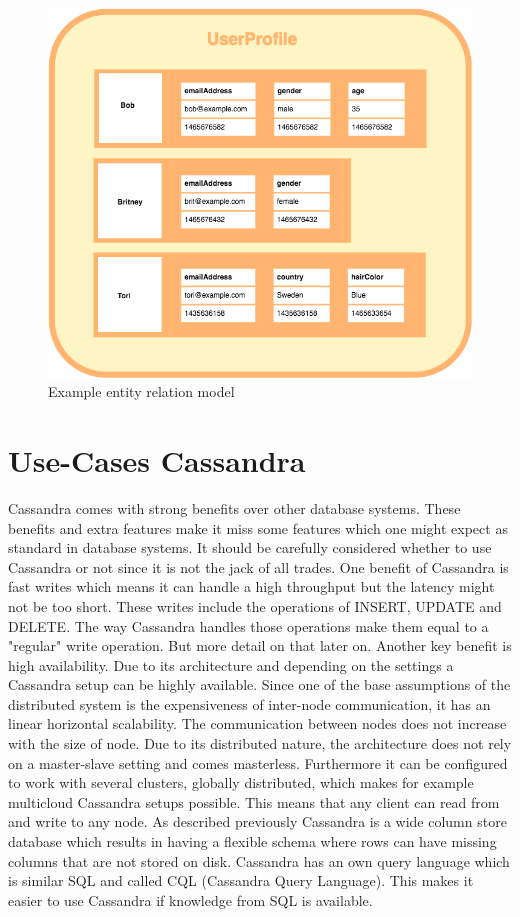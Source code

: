 \begin{figure}[H]
    \centering
    \includegraphics[width=0.75\columnwidth]{img/wide_column_store.png}
    \caption{Example entity relation model \autocite{wideColumnGraphic}}
    \label{fig:cassandra:wide_column}
\end{figure}


\section{Use-Cases Cassandra}
Cassandra comes with strong benefits over other database systems. These benefits and extra features make it miss some features which one might expect as standard in database systems.
It should be carefully considered whether to use Cassandra or not since it is not the jack of all trades.
One benefit of Cassandra is fast writes which means it can handle a high throughput but the latency might not be too short. These writes include the operations of {INSERT}, {UPDATE} and {DELETE}.
The way Cassandra handles those operations make them equal to a "regular" write operation. But more detail on that later on. Another key benefit is high availability. Due to its architecture and depending on the settings a Cassandra setup can be highly available. Since one of the base assumptions of the distributed system is the expensiveness of inter-node communication, it has an linear horizontal scalability.
The communication between nodes does not increase with the size of node. Due to its distributed nature, the architecture does not rely on a master-slave setting and comes masterless.
Furthermore it can be configured to work with several clusters, globally distributed, which makes for example multicloud Cassandra setups possible.
This means that any client can read from and write to any node. As described previously Cassandra is a wide column store database which results in having a flexible schema where rows can have missing columns that are not stored on disk.
Cassandra has an own query language which is similar SQL and called CQL (Cassandra Query Language). This makes it easier to use Cassandra if knowledge from SQL is available.

